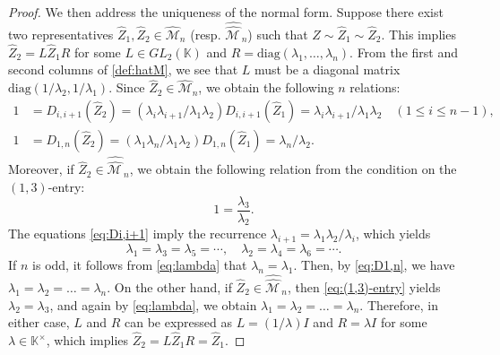 \documentclass[11pt]{amsart}
\theoremstyle{plain}
\theoremstyle{definition}
\theoremstyle{remark}
\begin{document}
\begin{proof}
We then address the uniqueness of the normal form. Suppose there exist two
representatives $\widehat{Z}_1, \widehat{Z}_2 \in \widehat{\mathcal{M}}_n$ (resp. $\widehat{\widehat{\mathcal{M\,}}}_{n}$) such that $Z \sim \widehat{Z}_1 \sim \widehat{Z}_2$. This
implies $\widehat{Z}_2 = L \widehat{Z}_1 R$ for some $L \in GL_2(\mathbb{K})$ and $R = \mathrm{diag}(\lambda_1, \dots, \lambda_n)$.
From the first and second columns of \eqref{def:hatM}, we see that $L$
must be a diagonal matrix $\mathrm{diag}(1/\lambda_2, 1/\lambda_1)$. Since $\widehat{Z}_2 \in \widehat{\mathcal{M}}_n$, we obtain the
following $n$ relations:
\begin{align}
1&=D_{i,i+1}(\widehat{Z}_2) = (\lambda_i \lambda_{i+1}/\lambda_1 \lambda_2) D_{i,i+1}(\widehat{Z}_1) = \lambda_i \lambda_{i+1}/\lambda_1 \lambda_2 \quad(1\leq i\leq n-1), \label{eq:Di,i+1}\\
1&=D_{1,n}(\widehat{Z}_2)=(\lambda_1 \lambda_{n}/\lambda_1 \lambda_2) D_{1,n}(\widehat{Z}_1) = \lambda_n/\lambda_2. \label{eq:D1,n}
\end{align}
Moreover, if $\widehat{Z}_2 \in \widehat{\widehat{\mathcal{M\,}}}_{n}$, we obtain the following relation from the condition
on the $(1,3)$-entry:
\begin{equation}
1=\frac{\lambda_3}{\lambda_2}. \label{eq:(1,3)-entry}
\end{equation}
The equations \eqref{eq:Di,i+1} imply the recurrence $\lambda_{i+1} = \lambda_1 \lambda_2 / \lambda_i$, which yields
\begin{equation}
\lambda_1=\lambda_3=\lambda_5=\cdots, \quad \lambda_2=\lambda_4=\lambda_6=\cdots. \label{eq:lambda}
\end{equation}
If $n$ is odd, it follows from \eqref{eq:lambda} that $\lambda_n = \lambda_1$.
Then, by \eqref{eq:D1,n}, we have $\lambda_1 = \lambda_2 = \dots = \lambda_n$.
On the other hand, if $\widehat{Z}_2 \in \widehat{\widehat{\mathcal{M\,}}}_{n}$, then \eqref{eq:(1,3)-entry} yields
$\lambda_2 = \lambda_3$, and again by \eqref{eq:lambda}, we obtain $\lambda_1 = \lambda_2 = \dots = \lambda_n$. Therefore,
in either case, $L$ and $R$ can be expressed as $L = (1/\lambda) I$ and
$R = \lambda I$ for some $\lambda \in \mathbb{K}^\times$, which implies $\widehat{Z}_2 = L \widehat{Z}_1 R = \widehat{Z}_1$.

\end{proof}
\end{document}
